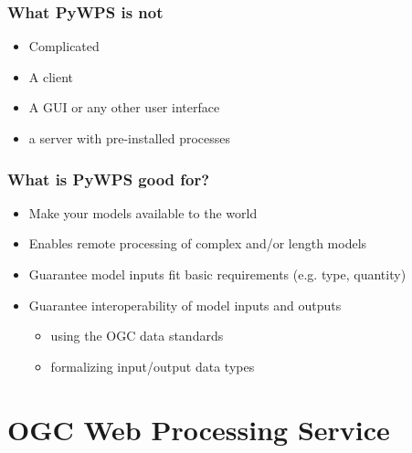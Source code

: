 \documentclass{beamer}
\begin{document}
\begin{frame}
\frametitle{What PyWPS is not}

\begin{itemize}
  \item Complicated
  \item A client
  \item A GUI or any other user interface
  \item a server with pre-installed processes 
\end{itemize}

\end{frame}



\begin{frame}
\frametitle{What is PyWPS good for?}

\begin{itemize}
  \item Make your models available to the world
  \item Enables remote processing of complex and/or length models 
  \item Guarantee model inputs fit basic requirements (e.g. type, quantity)
  \item Guarantee interoperability of model inputs and outputs
  \begin{itemize}
    \item using the OGC data standards
	\item formalizing input/output data types
  \end{itemize}
\end{itemize}
\end{frame}


\section{OGC Web Processing Service}
\end{document}
